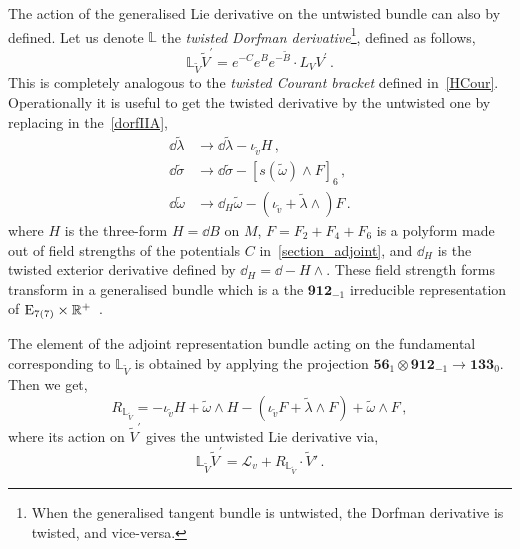 \documentclass[debug]{phd}
\begin{document}
					The action of the generalised Lie derivative on the untwisted bundle can also by defined.
					Let us denote $\mathbb{L}$ the \emph{twisted Dorfman derivative}\footnote{%
						When the generalised tangent bundle is untwisted, the Dorfman derivative is twisted, and vice-versa.%
						},
					defined as follows,
							\begin{equation}\label{eq:fromLtotildeL}
								\mathbb{L}_{\tilde{V}} \tilde{V}^\prime = e^{-C}e^{B}e^{-\tilde{B}} \cdot L_{V}V^\prime \, .
							\end{equation}
					This is completely analogous to the \emph{twisted Courant bracket} defined in~\eqref{HCour}.
					Operationally it is useful to get the twisted derivative by the untwisted one by replacing in the~\eqref{dorfIIA},
							\begin{equation}
								\begin{split}
									\dd \tilde{\lambda} 	& \longrightarrow \dd \tilde{\lambda} - \iota_{\tilde{v}} H \, , \\
									\dd \tilde{\sigma} 	& \longrightarrow \dd \tilde{\sigma} - \left[ s(\tilde{\omega}) \wedge F \right]_6 \, , \\
									\dd \tilde{\omega}	& \longrightarrow \dd_H \tilde{\omega} - (\iota_{\tilde{v}} + \tilde{\lambda}\wedge ) F \, .
								\end{split}
							\end{equation}
					where $H$ is the three-form $H = \dd B$ on $M$, $F = F_2 + F_4 + F_6$ is a polyform made out of field strengths of the potentials $C$ in~\eqref{section_adjoint}, and $\dd_H$ is the twisted exterior derivative defined by $\dd_H = \dd - H \wedge$.
					These field strength forms transform in a generalised bundle which is a the $\mathbf{912}_{-1}$ irreducible representation of $\mathrm{E}_{7(7)} \times \mathbb{R}^+$~\cite{Grana:2009im}.
					
					The element of the adjoint representation bundle acting on the fundamental corresponding to $\mathbb{L}_{\tilde{V}}$ is obtained by applying the projection $\mathbf{56}_{1} \otimes \mathbf{912}_{-1} \rightarrow \mathbf{133}_{0}$.
					Then we get,
							\begin{equation}
								R_{\mathbb{L}_{\tilde{V}}} = - \iota_{\tilde v} H + \tilde \omega \wedge H - ( \iota_{ \tilde v} F + \tilde \lambda \wedge F) + \tilde \omega \wedge F \, ,
							\end{equation}
					where its action on $\tilde{V}^\prime$ gives the untwisted Lie derivative via,
							\begin{equation}
								\mathbb{L}_{\tilde{V}} \tilde{V}^\prime = \mathcal{L}_v + R_{\mathbb{L}_{\tilde{V}}} \cdot \tilde{V}' \, .
							\end{equation}
					
\end{document}
